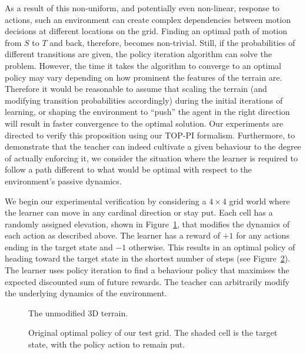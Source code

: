 As a result of this non-uniform, and potentially even non-linear,
response to actions, such an environment can create complex
dependencies between motion decisions at different locations on the
grid. Finding an optimal path of motion from $S$ to $T$ and back,
therefore, becomes non-trivial. Still, if the probabilities of
different transitions are given, the policy iteration algorithm can
solve the problem. However, the time it takes the
algorithm to converge to an optimal policy may vary depending on how
prominent the features of the terrain are. Therefore it would be
reasonable to assume that scaling the terrain (and modifying
transition probabilities accordingly) during the initial iterations of
learning, or shaping the environment to ``push'' the agent in the right
direction will result in faster convergence to the optimal
solution. Our experiments are directed to verify this proposition
using our TOP-PI formalism.  Furthermore, to demonstrate that the
teacher can indeed cultivate a given behaviour to the degree of actually 
enforcing it, we consider the situation where the learner is required
to follow a path different to what would be optimal with respect to
the environment's passive dynamics. %

We begin our experimental verification by considering a $4 \times 4$
grid world where the learner can move in any cardinal direction or
stay put.  Each cell has a randomly assigned elevation, shown in
Figure~\ref{probalt}, that modifies the dynamics of each action as
described above.  The learner has a reward of $+1$ for any actions
ending in the target state and $-1$ otherwise.  This results in an
optimal policy of heading toward the target state in the shortest
number of steps (see Figure~\ref{prevopt}).  The learner uses policy
iteration to find a behaviour policy that maximises the expected
discounted sum of future rewards. The teacher can arbitrarily modify
the underlying dynamics of the environment.

\begin{figure}[ht]
\centerline{}
\caption{\label{probalt}The unmodified 3D terrain.}
\end{figure}

\begin{figure}[ht]
\centerline{}
\caption{\label{prevopt}Original optimal policy of our test grid.  The shaded cell is the target state, with the policy action to remain put.}
\end{figure}

